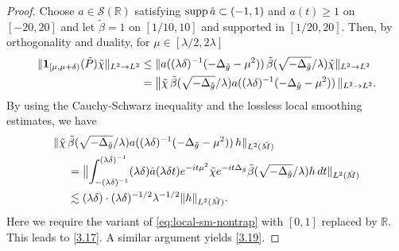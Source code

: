 \documentclass[10pt]{amsart}
\newcommand{\la}{\lambda}
\newcommand{\supp}{\mathrm{supp }}
\newcommand{\one}{{\bf 1}}
\newcommand{\1}{{\bf 1}}
\newcommand{\R}{{\mathbb R}}
\begin{document}
\begin{proof}  Choose $a\in {\mathcal S}(\R)$  satisfying $\supp \,  \Hat a\subset (-1,1)$ and $a(t)\ge 1$ on $[-20,20]$ and let $\tilde \beta=1$ on 
$[1/10,10]$ and supported in $[1/20,20]$.  Then, by orthogonality and duality, for $\mu\in [\la/2,2\la]$ 
\begin{align*}
\|\one_{[\mu,\mu+\delta)} (\tilde P)\tilde \chi \|_{L^2\to L^2}&\le \|a((\la\delta)^{-1}(-\Delta_{\tilde g}-\mu^2)) \, \tilde \beta(\sqrt{-\Delta_{\tilde g}}/\la)\tilde\chi \|_{L^2\to L^2}
\\
&= \bigl\| 
\tilde \chi\, \tilde\beta(\sqrt{-\Delta_{\tilde g}}/\la)  a((\la\delta)^{-1}(-\Delta_{\tilde g}-\mu^2)) \, \|_{L^2\to L^2}.
\end{align*} 
By using  the Cauchy-Schwarz inequality and the lossless local smoothing estimates, we have 
\begin{align*}
 \|\tilde \chi\,& \tilde\beta(\sqrt{-\Delta_{\tilde g}}/\la)  a((\la\delta)^{-1}(-\Delta_{\tilde g}-\mu^2)) \, h\|_{L^2(\tilde M)}
\\
&= \bigl\| 
\int_{-(\la\delta)^{-1}}^{(\la\delta)^{-1}} (\la\delta) \Hat a(\la\delta t) e^{-it\mu^2} \tilde\chi e^{-it\Delta_{\tilde g}} \tilde\beta(\sqrt{-\Delta_{\tilde g}}/\la) h \, dt \|_{L^2(\tilde M)}
\\
&\lesssim (\la\delta)\cdot (\la\delta)^{-1/2}\la^{-1/2}\|h\|_{L^2(\tilde M)}.
\end{align*}
Here
we require the variant of  \eqref{eq:local-sm-nontrap} with $[0,1]$ replaced by $\R$.  This leads to \eqref{3.17}.  A similar argument yields \eqref{3.19}.
\end{proof}
\end{document}
